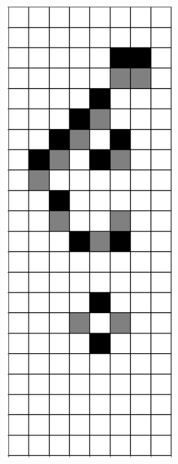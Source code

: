 \documentclass[12pt]{article}
\numberwithin{figure}{section} %
\begin{document}
\begin{figure}[H]
\begin{subfigure}{0.18\textwidth}
     		\subcaption{}
   	\end{subfigure}
        	\begin{subfigure}{0.18\textwidth}
     		\centering
     		\includegraphics[width=\linewidth]{Section4/20.3}

\end{subfigure}
\end{figure}
\end{document}
